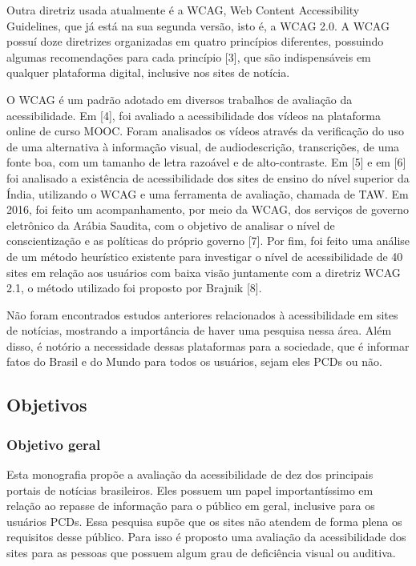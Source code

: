 \documentclass[a4paper]{article}
\begin{document}
\begin{titlepage}
Outra diretriz usada atualmente é a WCAG, Web Content Accessibility Guidelines, que já está na sua segunda versão, isto é, a WCAG 2.0. A WCAG possuí doze diretrizes organizadas em quatro princípios diferentes, possuindo algumas recomendações para cada princípio [3], que são indispensáveis em qualquer plataforma digital, inclusive nos sites de notícia.

O WCAG é um padrão adotado em diversos trabalhos de avaliação da acessibilidade. Em [4], foi avaliado a acessibilidade dos vídeos na plataforma online de curso MOOC. Foram analisados os vídeos através da verificação do uso de uma alternativa à informação visual, de audiodescrição, transcrições, de uma fonte boa, com um tamanho de letra razoável e de alto-contraste. Em [5] e em [6] foi analisado a existência de acessibilidade dos sites de ensino do nível superior da Índia, utilizando o WCAG e uma ferramenta de avaliação, chamada de TAW. Em 2016, foi feito um acompanhamento, por meio da WCAG, dos serviços de governo eletrônico da Arábia Saudita, com o objetivo de analisar o nível de conscientização e as políticas do próprio governo [7]. Por fim, foi feito uma análise de um método heurístico existente para investigar o nível de acessibilidade de 40 sites em relação aos usuários com baixa visão juntamente com a diretriz WCAG 2.1, o método utilizado foi proposto por Brajnik [8].

Não foram encontrados estudos anteriores relacionados à acessibilidade em sites de notícias, mostrando a importância de haver uma pesquisa nessa área. Além disso, é notório a necessidade dessas plataformas para a sociedade, que é informar fatos do Brasil e do Mundo para todos os usuários, sejam eles PCDs ou não.

\subsection{Objetivos}

\subsubsection{Objetivo geral}

Esta monografia propõe a avaliação da acessibilidade de dez dos principais portais de notícias brasileiros. Eles possuem um papel importantíssimo em relação ao repasse de informação para o público em geral, inclusive para os usuários PCDs. Essa pesquisa supõe que os sites não atendem de forma plena os requisitos desse público. Para isso é proposto uma avaliação da acessibilidade dos sites para as pessoas que possuem algum grau de deficiência visual ou auditiva. 


\end{titlepage}
\end{document}
